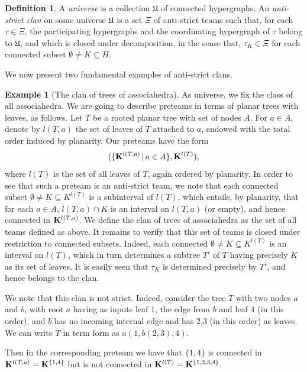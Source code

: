 \documentclass{article}
\theoremstyle{plain}
\theoremstyle{definition}
\newtheorem{definition}[thm]{Definition}
\newtheorem{example}[thm]{\sc Example}
\newcommand{\set}[1]{\{#1\}}
\begin{document}
 
\begin{definition}  \label{antistrict-clan-definition}
A \emph{universe} is a collection $\mathfrak{U}$ of connected hypergraphs. An \emph{anti-strict clan} on some universe $\mathfrak{U}$ is a set $\Xi$ of anti-strict teams such that, for each $\tau\in\Xi$, the participating hypergraphs and the  coordinating hypergraph of  $\tau$  belong to $\mathfrak{U}$, and which is closed under decomposition, in the sense that,   $\tau_K\in \Xi$ for each  connected subset  $\emptyset\neq K\subseteq H$.
\end{definition}



We now present two fundamental examples of anti-strict clans. 

\begin{example}[The clan of trees of associahedra]\label{treesassoc}
As universe, we fix the class of  all associahedra. We are going to describe preteams in terms of planar trees with leaves, as follows. Let $T$ be a rooted planar tree with  set of nodes $A$. For $a\in A$, denote by $l(T,a)$ the   set of leaves of $T$ attached to $a$, endowed with the total order induced by planarity. Our preteams have the form $$(\{{\bf K}^{l(T,a)}\,|\,a\in A\}, {\bf K}^{l(T)}),$$ where $l(T)$ is the set of all leaves of $T$, again ordered by planarity. In order to see that such a preteam is an anti-strict team, we note that each connected subset $\emptyset\neq K\subseteq {K}^{l(T)}$ is a  subinterval of $l(T)$, which entails, by planarity, that for each $a\in A$, $l(T,a)\cap K$ is an interval on $l(T,a)$ (or empty), and hence connected in ${\bf K}^{l(T,a)}$. We define the clan of trees of associahedra as the set of all teams defined as above. It remains to verify that this set of teams is closed under restriction to connected subsets.   Indeed, each connected $\emptyset \neq K\subseteq K^{l(T)}$ is an interval  on  $l(T)$, which in turn  determines a subtree $T'$ of $T$ having precisely $K$ as its set of leaves. It is easily seen that  $\tau_K$ is determined precisely by $T'$, and hence belongs to the clan. 

We note that this clan is not strict. Indeed, consider  the tree $T$ with two nodes $a$ and $b$, with  root $a$ having as inputs   leaf 1, the edge from $b$ and  leaf 4 (in this order), and  $b$ has no incoming internal edge and has 2,3 (in this order) as leaves. We can write $T$  in term form as $a(1,b(2,3),4)$.

 Then in the corresponding preteam we have that $\set{1,4}$ is connected in ${\bf K}^{l(T,a)}={\bf K}^{\set{1,4}}$ but is not connected in ${\bf K}^{l(T)}={\bf K}^{\set{1,2,3,4}}$.
\end{example}
 
\end{document}
